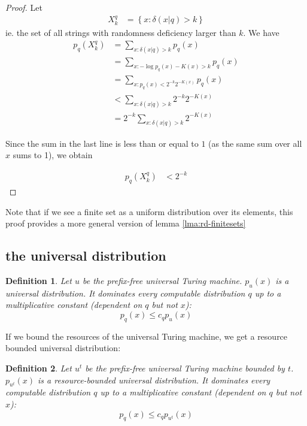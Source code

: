 \documentclass[10pt,a4paper,oneside]{article}
\newtheorem{dfn}{Definition}
\begin{document}
\begin{proof}
Let 
\begin{align*}
X_k^q &= \left\{x : \delta(x|q) > k \right\}
\end{align*}
ie. the set of all strings with randomness deficiency larger than $k$. We have 
\begin{align*}
p_q(X_k^q) &= \sum_{x:\delta(x|q)>k}p_q(x)\\
    &= \sum_{x: -\log p_q(x) - K(x) > k}p_q(x)\\
    &= \sum_{x:  p_q(x) < 2^{-k}2^{-K(x)}} p_q(x)\\
    &< \sum_{x:\delta(x|q) > k} 2^{-k} 2^{-K(x)}\\
    &= 2^{-k}\sum_{x:\delta(x|q) > k} 2^{-K(x)}
\end{align*}

Since the sum in the last line is less than or equal to $1$ (as the same sum over all $x$ sums to 1), we obtain

\begin{align*}
p_q(X_k^q) &< 2^{-k}
\end{align*}
\end{proof}

Note that if we see a finite set as a uniform distribution over its elements, this proof provides a more general version of lemma \ref{lma:rd-finitesets}

\subsection*{the universal distribution}

\begin{dfn}
Let $u$ be the prefix-free universal Turing machine. $p_u(x)$ is a \emph{universal distribution}. It dominates every computable distribution $q$ up to a multiplicative constant (dependent on $q$ but not $x$):
\[
p_q(x) \leq c_q p_u(x)
\]
\label{dfn:universal-distribution}
\end{dfn}

If we bound the resources of the universal Turing machine, we get a resource bounded universal distribution:


\begin{dfn}
Let $u^t$ be the prefix-free universal Turing machine bounded by $t$. $p_{u^t}(x)$ is a \emph{resource-bounded universal distribution}. It dominates every computable distribution $q$ up to a multiplicative constant (dependent on $q$ but not $x$):
\[
p_q(x) \leq c_q p_{u^t}(x)
\]

\label{dfn:resource-bounded-universal-distribution}
\end{dfn}
\end{document}
